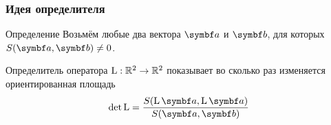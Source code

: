 \begin{frame}
\begin{minipage}[H]{0.48\linewidth}

    \end{minipage}
    

    

\end{frame}



\begin{frame}
    \frametitle{Идея определителя}

\begin{block}{Определение}
    Возьмём любые два вектора $\ba$ и $\bb$, для которых $S(\ba, \bb)\neq 0$.

    \alert{Определитель} оператора $\operatorname{L}:\mathbb{R}^2 \to \mathbb{R}^2$ показывает во сколько раз изменяется
    ориентированная площадь
    \[
    \det \LL = \frac{S(\LL\ba, \LL\ba)}{S(\ba, \bb)}    
    \]
\end{block}    
    

\end{frame}






